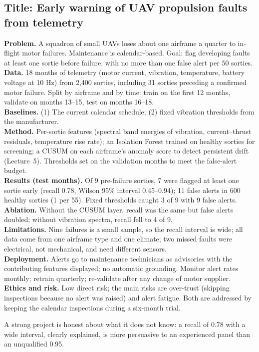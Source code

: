 \documentclass[11pt]{article}
\begin{document}
\subsection*{Title: Early warning of UAV propulsion faults from telemetry}
\textbf{Problem.} A squadron of small UAVs loses about one airframe a quarter to in-flight motor failures. Maintenance is calendar-based. Goal: flag developing faults at least one sortie before failure, with no more than one false alert per 50 sorties.\\
\textbf{Data.} 18 months of telemetry (motor current, vibration, temperature, battery voltage at 10 Hz) from 2,400 sorties, including 31 sorties preceding a confirmed motor failure. Split by airframe and by time: train on the first 12 months, validate on months 13--15, test on months 16--18.\\
\textbf{Baselines.} (1) The current calendar schedule; (2) fixed vibration thresholds from the manufacturer.\\
\textbf{Method.} Per-sortie features (spectral band energies of vibration, current--thrust residuals, temperature rise rate); an Isolation Forest trained on healthy sorties for screening; a CUSUM on each airframe's anomaly score to detect persistent drift (Lecture~5). Thresholds set on the validation months to meet the false-alert budget.\\
\textbf{Results (test months).} Of 9 pre-failure sorties, 7 were flagged at least one sortie early (recall 0.78, Wilson 95\% interval 0.45--0.94); 11 false alerts in 600 healthy sorties (1 per 55). Fixed thresholds caught 3 of 9 with 9 false alerts.\\
\textbf{Ablation.} Without the CUSUM layer, recall was the same but false alerts doubled; without vibration spectra, recall fell to 4 of 9.\\
\textbf{Limitations.} Nine failures is a small sample, so the recall interval is wide; all data come from one airframe type and one climate; two missed faults were electrical, not mechanical, and need different sensors.\\
\textbf{Deployment.} Alerts go to maintenance technicians as advisories with the contributing features displayed; no automatic grounding. Monitor alert rates monthly; retrain quarterly; re-validate after any change of motor supplier.\\
\textbf{Ethics and risk.} Low direct risk; the main risks are over-trust (skipping inspections because no alert was raised) and alert fatigue. Both are addressed by keeping the calendar inspections during a six-month trial.
\begin{keypoint}A strong project is honest about what it does not know: a recall of 0.78 with a wide interval, clearly explained, is more persuasive to an experienced panel than an unqualified 0.95.\end{keypoint}
\end{document}
